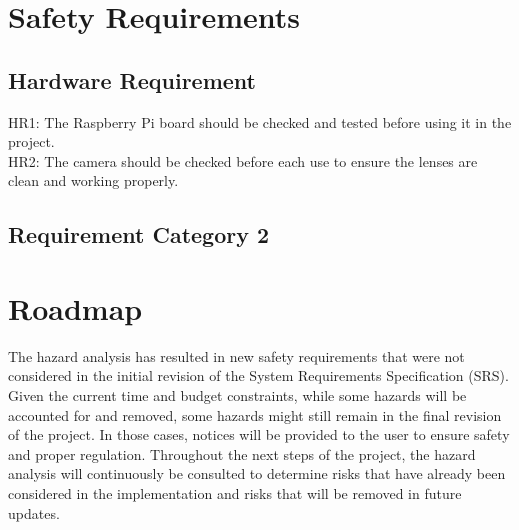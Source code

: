 \documentclass{article}
\begin{document}
\section{Safety Requirements}
\subsection{Hardware Requirement}
HR1: The Raspberry Pi board should be checked and tested before using it in the project.\\
HR2: The camera should be checked before each use to ensure the lenses are clean and working properly.

\subsection{Requirement Category 2}

\section{Roadmap}
The hazard analysis has resulted in new safety requirements that were not considered in the initial revision of the 
System Requirements Specification (SRS). Given the current time and budget constraints, while some hazards will be accounted 
for and removed, some hazards might still remain in the final revision of the project. In those cases, notices will be provided 
to the user to ensure safety and proper regulation. Throughout the next steps of the project, the hazard analysis will continuously 
be consulted to determine risks that have already been considered in the implementation and risks that will be removed in future updates.
\end{document}
